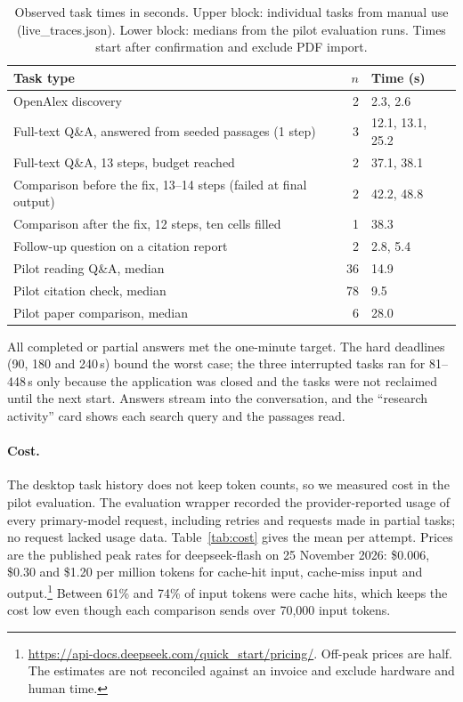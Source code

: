 \documentclass{article}
\newcommand{\code}[1]{{\ttfamily\small\hyphenchar\font=-1\relax #1}}
\begin{document}
\begin{table}[!hbp]
  \caption{Observed task times in seconds. Upper block: individual tasks from manual use
  (\code{live\_traces.json}). Lower block: medians from the pilot evaluation runs. Times start after
  confirmation and exclude PDF import.}
  \label{tab:latency}
  \small
  \centering
  \begin{tabular}{@{}lrl@{}}
    \toprule
    Task type & $n$ & Time (s) \\
    \midrule
    OpenAlex discovery & 2 & 2.3, 2.6 \\
    Full-text Q\&A, answered from seeded passages (1 step) & 3 & 12.1, 13.1, 25.2 \\
    Full-text Q\&A, 13 steps, budget reached & 2 & 37.1, 38.1 \\
    Comparison before the fix, 13--14 steps (failed at final output) & 2 & 42.2, 48.8 \\
    Comparison after the fix, 12 steps, ten cells filled & 1 & 38.3 \\
    Follow-up question on a citation report & 2 & 2.8, 5.4 \\
    \midrule
    Pilot reading Q\&A, median & 36 & 14.9 \\
    Pilot citation check, median & 78 & 9.5 \\
    Pilot paper comparison, median & 6 & 28.0 \\
    \bottomrule
  \end{tabular}
\end{table}

All completed or partial answers met the one-minute target. The hard deadlines (90, 180 and 240\,s)
bound the worst case; the three interrupted tasks ran for 81--448\,s only because the application was
closed and the tasks were not reclaimed until the next start. Answers stream into the conversation, and
the ``research activity'' card shows each search query and the passages read.

\paragraph{Cost.} The desktop task history does not keep token counts, so we measured cost in the
pilot evaluation. The evaluation wrapper recorded the provider-reported usage of every primary-model
request, including retries and requests made in partial tasks; no request lacked usage data.
Table~\ref{tab:cost} gives the mean per attempt. Prices are the published peak rates for
\code{deepseek-flash} on 25 November 2026: \$0.006, \$0.30 and \$1.20 per million tokens for
cache-hit input, cache-miss input and output.\footnote{\url{https://api-docs.deepseek.com/quick_start/pricing/}.
Off-peak prices are half. The estimates are not reconciled against an invoice and exclude hardware and
human time.} Between 61\% and 74\% of input tokens were cache hits, which keeps the cost low even
though each comparison sends over 70{,}000 input tokens.
\end{document}
